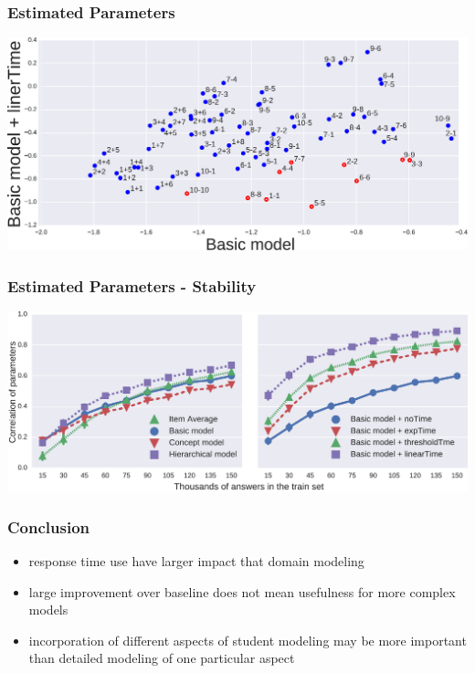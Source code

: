 \documentclass[xcolor=svgnames]{beamer}
\begin{document}
\begin{frame}
    \frametitle{Estimated Parameters}
    \includegraphics[width=\linewidth]{figures/difficulties}
\end{frame}
\begin{frame}
    \frametitle{Estimated Parameters - Stability}
    \includegraphics[width=\linewidth]{figures/stability}
\end{frame}
\begin{frame}
    \frametitle{Conclusion}
    \begin{itemize}
        \item response time use have larger impact that domain modeling
        \item large improvement over baseline does not mean usefulness for more complex models
        \item incorporation of different aspects of student modeling may
        be more important than detailed modeling of one particular aspect
    \end{itemize}
\end{frame}
\end{document}
